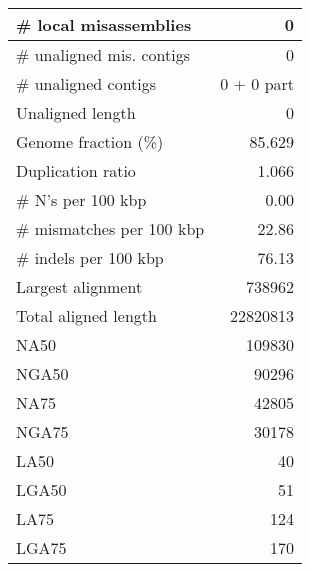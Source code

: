 \documentclass[12pt,a4paper]{article}
\begin{document}
\begin{table}[ht]
\begin{center}
\begin{tabular}{|l*{1}{|r}|}
\# local misassemblies & 0 \\ \hline
\# unaligned mis. contigs & 0 \\ \hline
\# unaligned contigs & 0 + 0 part \\ \hline
Unaligned length & 0 \\ \hline
Genome fraction (\%) & 85.629 \\ \hline
Duplication ratio & 1.066 \\ \hline
\# N's per 100 kbp & 0.00 \\ \hline
\# mismatches per 100 kbp & 22.86 \\ \hline
\# indels per 100 kbp & 76.13 \\ \hline
Largest alignment & 738962 \\ \hline
Total aligned length & 22820813 \\ \hline
NA50 & 109830 \\ \hline
NGA50 & 90296 \\ \hline
NA75 & 42805 \\ \hline
NGA75 & 30178 \\ \hline
LA50 & 40 \\ \hline
LGA50 & 51 \\ \hline
LA75 & 124 \\ \hline
LGA75 & 170 \\ \hline
\end{tabular}
\end{center}
\end{table}
\end{document}
